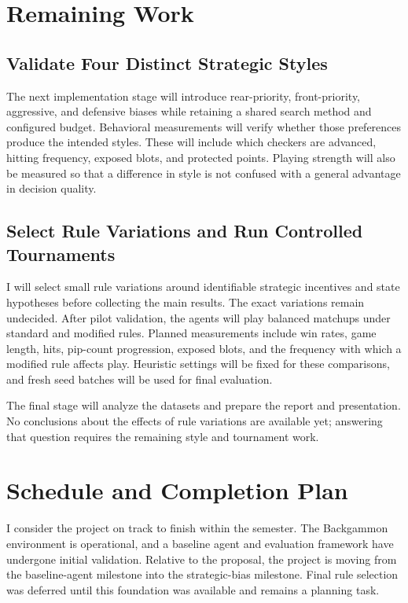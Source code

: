 \documentclass[12pt,twoside]{article}
\begin{document}
\section{Remaining Work}

\subsection{Validate Four Distinct Strategic Styles}

The next implementation stage will introduce rear-priority, front-priority,
aggressive, and defensive biases while retaining a shared search method and
configured budget. Behavioral measurements will verify whether those preferences
produce the intended styles. These will include which checkers are advanced,
hitting frequency, exposed blots, and protected points. Playing strength will
also be measured so that a difference in style is not confused with a general
advantage in decision quality.

\subsection{Select Rule Variations and Run Controlled Tournaments}

I will select small rule variations around identifiable strategic incentives
and state hypotheses before collecting the main results. The exact variations
remain undecided. After pilot validation, the agents will play balanced
matchups under standard and modified rules. Planned measurements include win
rates, game length, hits, pip-count progression, exposed blots, and the frequency
with which a modified rule affects play. Heuristic settings will be fixed for
these comparisons, and fresh seed batches will be used for final evaluation.

The final stage will analyze the datasets and prepare the report and
presentation. No conclusions about the effects of rule variations are available
yet; answering that question requires the remaining style and tournament work.

\section{Schedule and Completion Plan}

I consider the project on track to finish within the semester. The Backgammon
environment is operational, and a baseline agent and evaluation framework have
undergone initial validation. Relative to the proposal, the project is moving
from the baseline-agent milestone into the strategic-bias milestone. Final rule
selection was deferred until this foundation was available and remains a
planning task.
\end{document}
